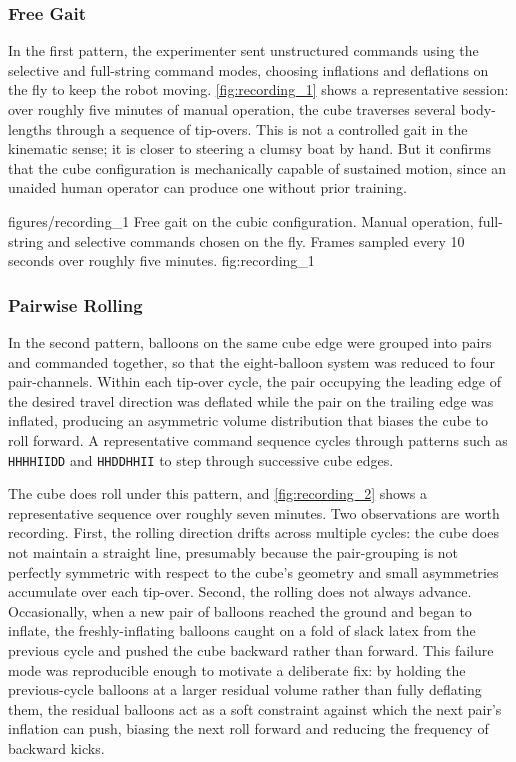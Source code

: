 \subsubsection{Free Gait}
\label{subsubsec:cube-free-gait}

In the first pattern, the experimenter sent unstructured commands using the selective and full-string command modes, choosing inflations and deflations on the fly to keep the robot moving. \cref{fig:recording_1} shows a representative session: over roughly five minutes of manual operation, the cube traverses several body-lengths through a sequence of tip-overs. This is not a controlled gait in the kinematic sense; it is closer to steering a clumsy boat by hand. But it confirms that the cube configuration is mechanically capable of sustained motion, since an unaided human operator can produce one without prior training.

\figcap
{figures/recording_1}
{Free gait on the cubic configuration.}
{Manual operation, full-string and selective commands chosen on the fly. Frames sampled every 10 seconds over roughly five minutes.}
{fig:recording_1}
{\linewidth}

\subsubsection{Pairwise Rolling}
\label{subsubsec:cube-pairwise}

In the second pattern, balloons on the same cube edge were grouped into pairs and commanded together, so that the eight-balloon system was reduced to four pair-channels. Within each tip-over cycle, the pair occupying the leading edge of the desired travel direction was deflated while the pair on the trailing edge was inflated, producing an asymmetric volume distribution that biases the cube to roll forward. A representative command sequence cycles through patterns such as \texttt{HHHHIIDD} and \texttt{HHDDHHII} to step through successive cube edges.

The cube does roll under this pattern, and \cref{fig:recording_2} shows a representative sequence over roughly seven minutes. Two observations are worth recording. First, the rolling direction drifts across multiple cycles: the cube does not maintain a straight line, presumably because the pair-grouping is not perfectly symmetric with respect to the cube's geometry and small asymmetries accumulate over each tip-over. Second, the rolling does not always advance. Occasionally, when a new pair of balloons reached the ground and began to inflate, the freshly-inflating balloons caught on a fold of slack latex from the previous cycle and pushed the cube backward rather than forward. This failure mode was reproducible enough to motivate a deliberate fix: by holding the previous-cycle balloons at a larger residual volume rather than fully deflating them, the residual balloons act as a soft constraint against which the next pair's inflation can push, biasing the next roll forward and reducing the frequency of backward kicks.

